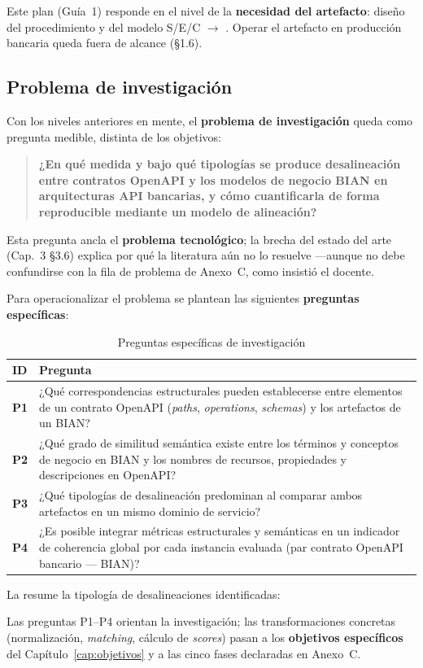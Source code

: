 Este plan (Guía~1) responde en el nivel de la \textbf{necesidad del artefacto}: diseño del
procedimiento y del modelo S/E/C $\rightarrow$ \AlignmentScore{}. Operar el artefacto en producción
bancaria queda fuera de alcance (§1.6).

\subsection{Problema de investigación}

Con los niveles anteriores en mente, el \textbf{problema de investigación} queda como pregunta
medible, distinta de los objetivos:

\begin{quote}
  \textbf{¿En qué medida y bajo qué tipologías se produce desalineación entre contratos OpenAPI y
  los modelos de negocio BIAN en arquitecturas API bancarias, y cómo cuantificarla de forma
  reproducible mediante un modelo de alineación?}
\end{quote}

Esta pregunta ancla el \textbf{problema tecnológico}; la brecha del estado del arte (Cap.~3 §3.6)
explica por qué la literatura aún no lo resuelve ---aunque no debe confundirse con la fila de
problema de Anexo~C, como insistió el docente.

Para operacionalizar el problema se plantean las siguientes \textbf{preguntas específicas}:

\begin{table}[H]
  \centering
  \caption{Preguntas específicas de investigación}
  \label{tab:preguntas}
  \small
  \begin{tabular}{@{}p{}p{}@{}}
    \toprule
    \textbf{ID} & \textbf{Pregunta} \\
    \midrule
    \textbf{P1} &
    ¿Qué correspondencias estructurales pueden establecerse entre elementos de un contrato OpenAPI
    (\textit{paths}, \textit{operations}, \textit{schemas}) y los artefactos de un \ServiceDomain{}
    BIAN? \\
    \textbf{P2} &
    ¿Qué grado de similitud semántica existe entre los términos y conceptos de negocio en BIAN y los
    nombres de recursos, propiedades y descripciones en OpenAPI? \\
    \textbf{P3} &
    ¿Qué tipologías de desalineación predominan al comparar ambos artefactos en un mismo dominio de
    servicio? \\
    \textbf{P4} &
    ¿Es posible integrar métricas estructurales y semánticas en un indicador de coherencia global
    por cada instancia evaluada (par contrato OpenAPI bancario --- \ServiceDomain{} BIAN)? \\
    \bottomrule
  \end{tabular}
\end{table}

La  resume la tipología de desalineaciones identificadas:



Las preguntas P1--P4 orientan la investigación; las transformaciones concretas (normalización,
\textit{matching}, cálculo de \textit{scores}) pasan a los \textbf{objetivos específicos} del
Capítulo~\ref{cap:objetivos} y a las cinco fases declaradas en Anexo~C.
